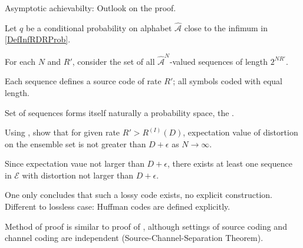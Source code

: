 \begin{frame}{Asymptotic achievabilty: Outlook on the proof. }
\bit
\item Let $q$ be a conditional probability on alphabet $\widehat{\mathcal{A}}$ close to the infimum in \eqref{DefInfRDRProb}.  
\item For each $N$ and $R'$, consider the set of all ${\widehat{\mathcal{A}}}^N$-valued sequences of length $2^{NR'}$.
\item Each sequence defines a source code of rate $R'$; all symbols coded with equal length. 
\item Set of sequences forms itself naturally a probability space, the .   
\item Using , show that for given rate $R'>R^{(I)}(D)$, expectation value of distortion on the ensemble 
set is not greater than $D+\epsilon$ as $N\to \infty$.   
\item Since expectation vaue not larger than $D+\epsilon$, there exists at least one sequence in $\mathcal{E}$ with distortion not larger than $D+\epsilon$. 
\eit
{}
\bit
\item {} One only concludes that such a lossy code exists, no explicit construction. Different to lossless case: Huffman codes are defined explicitly.  
\item Method of proof is similar to proof of , although settings of source coding and channel coding are independent (Source-Channel-Separation Theorem). 
\eit 
\end{frame}


